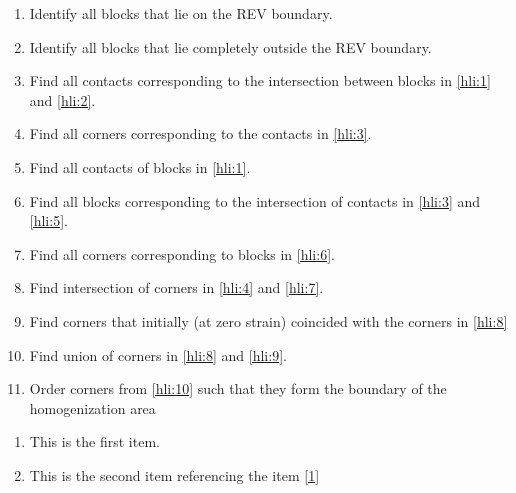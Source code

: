 \begin{enumerate}
\item \label{hli:1} Identify all blocks that lie on the REV boundary. 
\item \label{hli:2} Identify all blocks that lie completely outside the
REV boundary. 
\item \label{hli:3} Find all contacts corresponding to the intersection
between blocks in \ref{hli:1} and \ref{hli:2}. 
\item \label{hli:4} Find all corners corresponding to the contacts in \ref{hli:3}. 
\item \label{hli:5} Find all contacts of blocks in \ref{hli:1}. 
\item \label{hli:6} Find all blocks corresponding to the intersection of
contacts in \ref{hli:3} and \ref{hli:5}. 
\item \label{hli:7} Find all corners corresponding to blocks in \ref{hli:6}. 
\item \label{hli:8} Find intersection of corners in \ref{hli:4} and \ref{hli:7}. 
\item \label{hli:9} Find corners that initially (at zero strain) coincided
with the corners in \ref{hli:8} 
\item \label{hli:10} Find union of corners in \ref{hli:8} and \ref{hli:9}. 
\item \label{hli:11} Order corners from \ref{hli:10} such that they form
the boundary of the homogenization area
\end{enumerate}

\begin{enumerate}
\item \label{1} This is the first item. 
\item \label{2} This is the second item referencing the item \ref{1}
\end{enumerate}
